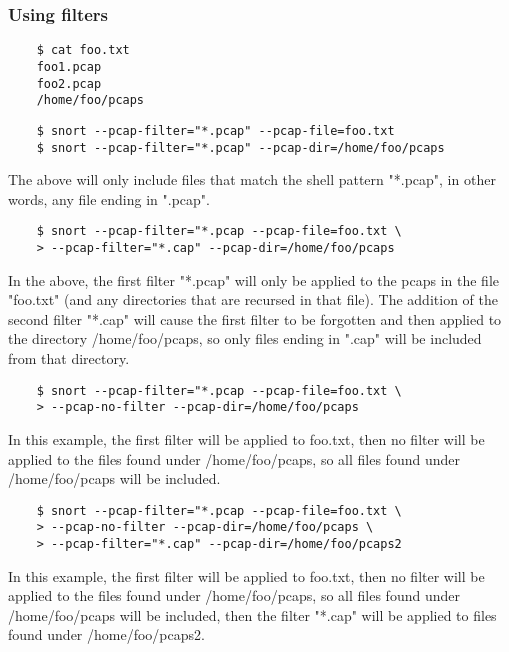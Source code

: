 \documentclass[english]{report}
\begin{document}
\subsubsection{Using filters}

\begin{verbatim}
    $ cat foo.txt
    foo1.pcap
    foo2.pcap
    /home/foo/pcaps
\end{verbatim}

\begin{verbatim}
    $ snort --pcap-filter="*.pcap" --pcap-file=foo.txt
    $ snort --pcap-filter="*.pcap" --pcap-dir=/home/foo/pcaps
\end{verbatim}

The above will only include files that match the shell pattern "*.pcap", in
other words, any file ending in ".pcap".

\begin{verbatim}
    $ snort --pcap-filter="*.pcap --pcap-file=foo.txt \
    > --pcap-filter="*.cap" --pcap-dir=/home/foo/pcaps
\end{verbatim}

In the above, the first filter "*.pcap" will only be applied to the pcaps in
the file "foo.txt" (and any directories that are recursed in that file).  The
addition of the second filter "*.cap" will cause the first filter to be
forgotten and then applied to the directory /home/foo/pcaps, so only files
ending in ".cap" will be included from that directory.

\begin{verbatim}
    $ snort --pcap-filter="*.pcap --pcap-file=foo.txt \
    > --pcap-no-filter --pcap-dir=/home/foo/pcaps
\end{verbatim}

In this example, the first filter will be applied to foo.txt, then no filter
will be applied to the files found under /home/foo/pcaps, so all files found
under /home/foo/pcaps will be included. 

\begin{verbatim}
    $ snort --pcap-filter="*.pcap --pcap-file=foo.txt \
    > --pcap-no-filter --pcap-dir=/home/foo/pcaps \
    > --pcap-filter="*.cap" --pcap-dir=/home/foo/pcaps2
\end{verbatim}

In this example, the first filter will be applied to foo.txt, then no filter
will be applied to the files found under /home/foo/pcaps, so all files found
under /home/foo/pcaps will be included, then the filter "*.cap" will be applied
to files found under /home/foo/pcaps2. 
\end{document}
